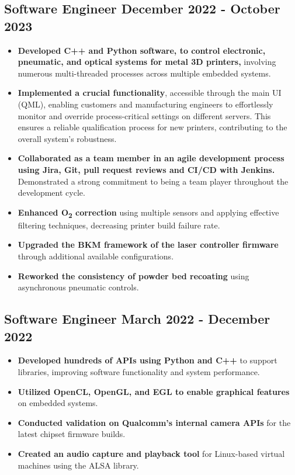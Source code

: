 \documentclass[]{article}
\begin{document}
\subsection{{\large{Software Engineer} \hfill{\small{December 2022 - October 2023}}}}
\vspace{1.5ex}

\begin{itemize}
    \item \textbf{Developed C++ and Python software, to control electronic, pneumatic, and optical systems for metal 3D printers,} involving numerous multi-threaded processes across multiple embedded systems.
    \item \textbf{Implemented a crucial functionality}, accessible through the main UI (QML), enabling customers and manufacturing engineers to effortlessly monitor and override process-critical settings on different servers. 
    This ensures a reliable qualification process for new printers, contributing to the overall system's robustness.
    \item \textbf{Collaborated as a team member in an agile development process using Jira, Git, pull request reviews and CI/CD with Jenkins.} Demonstrated a strong commitment to being a team player throughout the development cycle.
    \item \textbf{Enhanced O\textsubscript{2} correction} using multiple sensors and applying effective filtering techniques, decreasing printer build failure rate.
    \item \textbf{Upgraded the BKM framework of the laser controller firmware} through additional available configurations.
    \item \textbf{Reworked the consistency of powder bed recoating} using asynchronous pneumatic controls.
\end{itemize}

\vspace{2ex}

\subsection{{\large{Software Engineer} \hfill{\small{March 2022 - December 2022}}}}
\vspace{1.5ex}

\begin{itemize}
    \item \textbf{Developed hundreds of APIs using Python and C++} to support libraries, improving software functionality and system performance.
    \item \textbf{Utilized OpenCL, OpenGL, and EGL to enable graphical features} on embedded systems.
    \item \textbf{Conducted validation on Qualcomm's internal camera APIs} for the latest chipset firmware builds. 
    \item \textbf{Created an audio capture and playback tool} for Linux-based virtual machines using the ALSA library.
\end{itemize}
\end{document}
